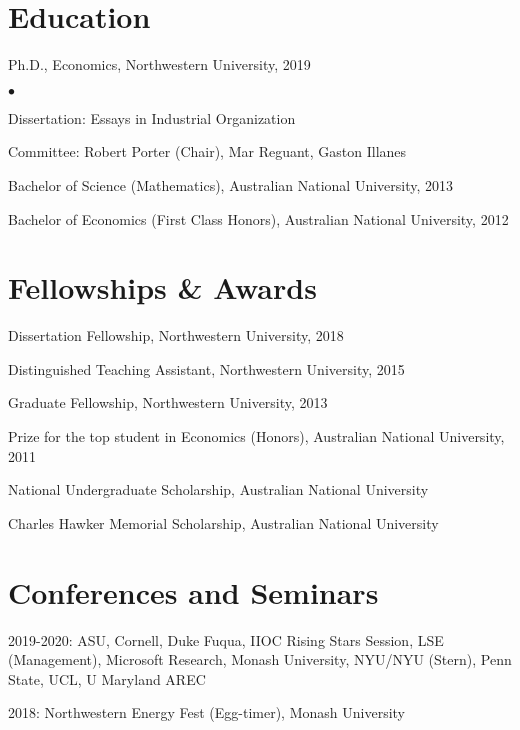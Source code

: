 \documentclass[margin,line]{res}
\newenvironment{list1}{
  \begin{list}{\ding{113}}{%
      \setlength{\itemsep}{.025in}
      \setlength{\parsep}{0in} \setlength{\parskip}{0in}
      \setlength{\topsep}{0in} \setlength{\partopsep}{0in}
      \setlength{\leftmargin}{0.17in}}}{\end{list}}
\newenvironment{list2}{
  \begin{list}{$\bullet$}{%
      \setlength{\itemsep}{0in}
      \setlength{\parsep}{0in} \setlength{\parskip}{0in}
      \setlength{\topsep}{0in} \setlength{\partopsep}{0in}
      \setlength{\leftmargin}{0.2in}}}{\end{list}}
\begin{document}
\begin{resume}
\section{ Education}\begin{tiny}

\end{tiny}
\begin{list1}
\item[] Ph.D., Economics, Northwestern University, 2019
	\begin{list2}
		\item[] Dissertation: Essays in Industrial Organization
		\item[] Committee: Robert Porter (Chair), Mar Reguant, Gaston Illanes
	\end{list2}
\item[] Bachelor of Science (Mathematics), Australian National University, 2013
\item[] Bachelor of Economics (First Class Honors), Australian National University, 2012
\end{list1}

\section{Fellowships \& Awards}
\begin{list1}
\item[] Dissertation Fellowship, Northwestern University, 2018
\item[] Distinguished Teaching Assistant, Northwestern University, 2015
\item[] Graduate Fellowship, Northwestern University, 2013
\item[] Prize for the top student in Economics (Honors), Australian National University, 2011
\item[] National Undergraduate Scholarship, Australian National University
\item[] Charles Hawker Memorial Scholarship, Australian National University
\end{list1}

\section{ Conferences and Seminars}
\begin{list1}
\item[] 2019-2020: ASU, Cornell, Duke Fuqua, IIOC Rising Stars Session, LSE (Management), Microsoft Research, Monash University, NYU/NYU (Stern), Penn State, UCL, U Maryland AREC
\item[] 2018: Northwestern Energy Fest (Egg-timer), Monash University
\end{list1}


\end{resume}
\end{document}
